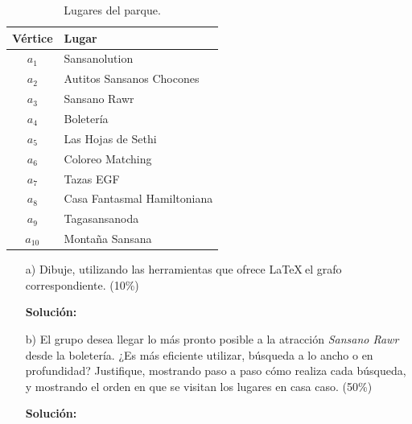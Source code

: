 \documentclass[letterpaper,10pt]{article}
\begin{document}
\begin{enumerate}
\begin{minipage}[h]{0.36\textwidth}
\begin{table}[H]
\begin{center}
        \end{center}
    \end{table}
    
    \end{minipage}
    \hfill
    \begin{minipage}[h]{0.40\textwidth}
    \footnotesize
    \begin{table}[H]
        \begin{center}
            
            \begin{tabular}{|c|l|}
            \hline
            \textbf{Vértice} & \textbf{Lugar}\\ \hline
            $a_1$ & Sansanolution\\
            $a_2$ & Autitos Sansanos Chocones\\
            $a_3$ & Sansano Rawr\\
            $a_4$ & Boletería\\
            $a_5$ & Las Hojas de Sethi\\
            $a_6$ & Coloreo Matching\\
            $a_7$ & Tazas EGF\\
            $a_8$ & Casa Fantasmal Hamiltoniana\\
            $a_9$ & Tagasansanoda\\
            $a_{10}$ & Montaña Sansana\\
            \hline
            \end{tabular}
        \caption{Lugares del parque.}\label{tab:atracciones}
        \end{center}
    \end{table}
    \end{minipage}
    \begin{itemize}
        \item[a) ]Dibuje, utilizando las herramientas que ofrece \LaTeX  $~$el grafo correspondiente. (10\%)
        
        \textbf{Solución:}
        
        \item[b) ]El grupo desea llegar lo más pronto posible a la atracción \textit{Sansano Rawr} desde la boletería. ¿Es más eficiente utilizar, búsqueda a lo ancho o en profundidad? Justifique, mostrando paso a paso cómo realiza cada búsqueda, y mostrando el orden en que se visitan los lugares en casa caso. (50\%)
        
        \textbf{Solución:}
        
    \end{itemize}


\end{enumerate}
\end{document}
